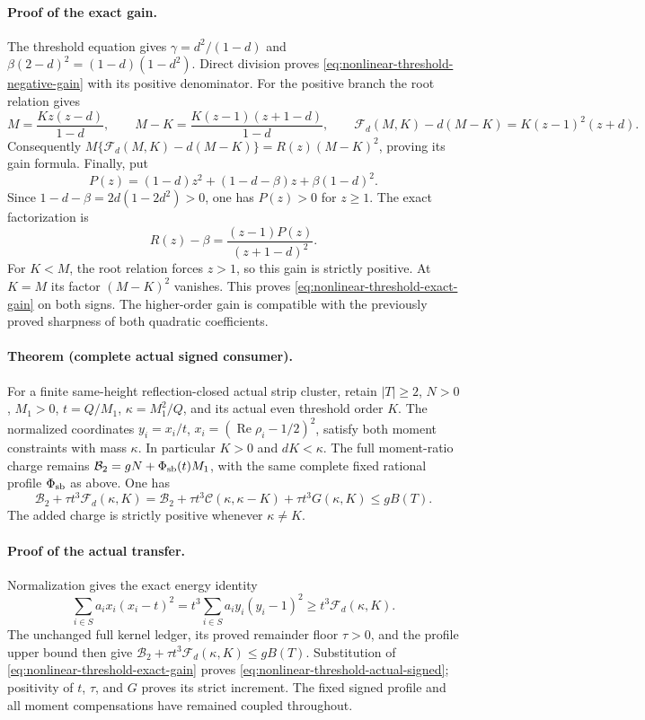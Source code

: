\paragraph{Proof of the exact gain.}
The threshold equation gives
\(\gamma=d^2/(1-d)\) and
\(\beta(2-d)^2=(1-d)(1-d^2)\).  Direct division proves
\eqref{eq:nonlinear-threshold-negative-gain} with its positive denominator.
For the positive branch the root relation gives
\[
 M=\frac{Kz(z-d)}{1-d},\qquad
 M-K=\frac{K(z-1)(z+1-d)}{1-d},\qquad
 \mathcal F_d(M,K)-d(M-K)=K(z-1)^2(z+d).
\]
Consequently
\(M\{\mathcal F_d(M,K)-d(M-K)\}=R(z)(M-K)^2\), proving its gain formula.
Finally, put
\[
 P(z)=(1-d)z^2+(1-d-\beta)z+\beta(1-d)^2.
\]
Since \(1-d-\beta=2d(1-2d^2)>0\), one has \(P(z)>0\) for \(z\ge1\).
The exact factorization is
\[
 R(z)-\beta=\frac{(z-1)P(z)}{(z+1-d)^2}.
\]
For \(K<M\), the root relation forces \(z>1\), so this gain is strictly
positive.  At \(K=M\) its factor \((M-K)^2\) vanishes.  This proves
\eqref{eq:nonlinear-threshold-exact-gain} on both signs.  The higher-order
gain is compatible with the previously proved sharpness of both quadratic
coefficients.

\paragraph{Theorem (complete actual signed consumer).}
For a finite same-height reflection-closed actual strip cluster, retain
\(|T|\ge2\), \(N>0\), \(M_1>0\), \(t=Q/M_1\),
\(\kappa=M_1^2/Q\), and its actual even threshold order \(K\).
The normalized coordinates \(y_i=x_i/t\),
\(x_i=(\operatorname{Re}\rho_i-1/2)^2\), satisfy both moment constraints
with mass \(\kappa\).  In particular \(K>0\) and \(dK<\kappa\).
The full moment-ratio charge remains
\(\mathcal B_2=gN+\Phi_{\rm sb}(t)M_1\), with the same complete fixed
rational profile \(\Phi_{\rm sb}\) as above.  One has
\begin{equation}
 \mathcal B_2+\tau t^3\mathcal F_d(\kappa,K)
 =\mathcal B_2+\tau t^3\mathcal C(\kappa,\kappa-K)
       +\tau t^3G(\kappa,K)\le gB(T).
 \label{eq:nonlinear-threshold-actual-signed}
\end{equation}
The added charge is strictly positive whenever \(\kappa\ne K\).

\paragraph{Proof of the actual transfer.}
Normalization gives the exact energy identity
\[
 \sum_{i\in S}a_i x_i(x_i-t)^2
   =t^3\sum_{i\in S}a_i y_i(y_i-1)^2
   \ge t^3\mathcal F_d(\kappa,K).
\]
The unchanged full kernel ledger, its proved remainder floor \(\tau>0\),
and the profile upper bound then give
\(\mathcal B_2+\tau t^3\mathcal F_d(\kappa,K)\le gB(T)\).
Substitution of \eqref{eq:nonlinear-threshold-exact-gain} proves
\eqref{eq:nonlinear-threshold-actual-signed}; positivity of \(t\), \(\tau\),
and \(G\) proves its strict increment.  The fixed signed profile and all
moment compensations have remained coupled throughout.

